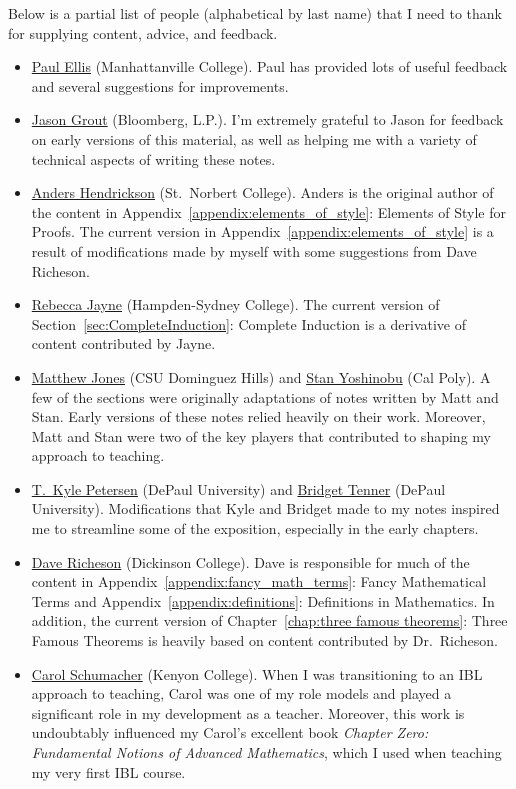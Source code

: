 \documentclass[12pt,oneside]{book}
\theoremstyle{definition}
\begin{document}
\noindent Below is a partial list of people (alphabetical by last name) that I need to thank for supplying content, advice, and feedback.
\begin{itemize}
\item \href{http://www.paulellis.org}{Paul Ellis} (Manhattanville College). Paul has provided lots of useful feedback and several suggestions for improvements.
\item \href{http://jasongrout.org}{Jason Grout} (Bloomberg, L.P.).  I'm extremely grateful to Jason for feedback on early versions of this material, as well as helping me with a variety of technical aspects of writing these notes.
\item \href{http://home.snc.edu/andershendrickson/}{Anders Hendrickson} (St.~Norbert College). Anders is the original author of the content in Appendix~\ref{appendix:elements_of_style}: Elements of Style for Proofs. The current version in Appendix~\ref{appendix:elements_of_style} is a result of modifications made by myself with some suggestions from Dave Richeson.
\item \href{http://www.hsc.edu/rebecca-jayne}{Rebecca Jayne} (Hampden-Sydney College). The current version of Section~\ref{sec:CompleteInduction}: Complete Induction is a derivative of content contributed by Jayne.
\item \href{http://www4.csudh.edu/library/info/civic-directory/f-j/matthew-g-jones}{Matthew Jones} (CSU Dominguez Hills) and \href{http://www.stanyoshinobu.com}{Stan Yoshinobu} (Cal Poly). A few of the sections were originally adaptations of notes written by Matt and Stan. Early versions of these notes relied heavily on their work. Moreover, Matt and Stan were two of the key players that contributed to shaping my approach to teaching.
\item \href{http://math.depaul.edu/tpeter21/}{T.~Kyle Petersen} (DePaul University) and \href{http://math.depaul.edu/bridget/}{Bridget Tenner} (DePaul University). Modifications that Kyle and Bridget made to my notes inspired me to streamline some of the exposition, especially in the early chapters.
\item \href{http://users.dickinson.edu/~richesod/}{Dave Richeson} (Dickinson College). Dave is responsible for much of the content in Appendix~\ref{appendix:fancy_math_terms}: Fancy Mathematical Terms and Appendix~\ref{appendix:definitions}: Definitions in Mathematics. In addition, the current version of Chapter~\ref{chap:three famous theorems}: Three Famous Theorems is heavily based on content contributed by Dr.~Richeson.
\item \href{http://www2.kenyon.edu/Depts/Math/schumacherc/public_html/}{Carol Schumacher} (Kenyon College). When I was transitioning to an IBL approach to teaching, Carol was one of my role models and played a significant role in my development as a teacher.  Moreover, this work is undoubtably influenced my Carol's excellent book \emph{Chapter Zero: Fundamental Notions of Advanced Mathematics}, which I used when teaching my very first IBL course.
\end{itemize}
\end{document}
